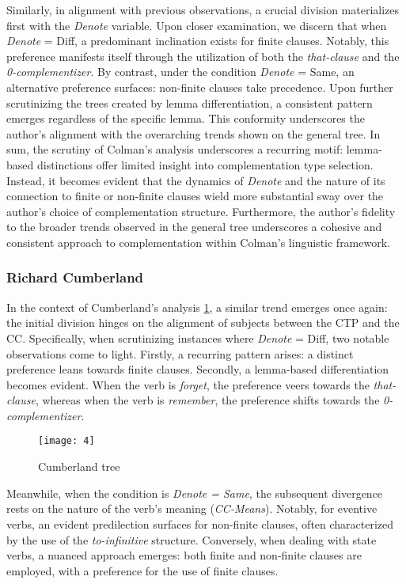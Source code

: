 \documentclass[final]{clv3} %
\begin{document}
Similarly, in alignment with previous observations, a crucial division materializes first with the \textit{Denote} variable. Upon closer examination, we discern that when \textit{Denote} = Diff, a predominant inclination exists for finite clauses. Notably, this preference manifests itself through the utilization of both the \textit{that-clause} and the \textit{0-complementizer}. By contrast, under the condition \textit{Denote} = Same, an alternative preference surfaces: non-finite clauses take precedence.
Upon further scrutinizing the trees created by lemma differentiation, a consistent pattern emerges regardless of the specific lemma. This conformity underscores the author’s alignment with the overarching trends shown on the general tree.
In sum, the scrutiny of Colman’s analysis underscores a recurring motif: lemma-based distinctions offer limited insight into complementation type selection. Instead, it becomes evident that the dynamics of \textit{Denote} and the nature of its connection to finite or non-finite clauses wield more substantial sway over the author’s choice of complementation structure. Furthermore, the author’s fidelity to the broader trends observed in the general tree underscores a cohesive and consistent approach to complementation within Colman’s linguistic framework.


\subsubsection{Richard Cumberland}

In the context of Cumberland's analysis \cref{fig:6}, a similar trend emerges once again: the initial division hinges on the alignment of subjects between the CTP and the CC. Specifically, when scrutinizing instances where \textit{Denote} = Diff, two notable observations come to light. Firstly, a recurring pattern arises: a distinct preference leans towards finite clauses. Secondly, a lemma-based differentiation becomes evident. When the verb is \textit{forget}, the preference veers towards the \textit{\textit{that-clause}}, whereas when the verb is \textit{remember}, the preference shifts towards the \textit{\textit{0-complementizer}}.

\begin{figure}[htpb]
    \centering
    \texttt{[image: 4]}
    \caption{Cumberland tree}
    \label{fig:6}
\end{figure}

Meanwhile, when the condition is \textit{\textit{Denote} = Same}, the subsequent divergence rests on the nature of the verb's meaning (\textit{CC-Means}). Notably, for eventive verbs, an evident predilection surfaces for non-finite clauses, often characterized by the use of the \textit{\textit{to-infinitive}} structure. Conversely, when dealing with state verbs, a nuanced approach emerges: both finite and non-finite clauses are employed, with a preference for the use of finite clauses.
\end{document}
